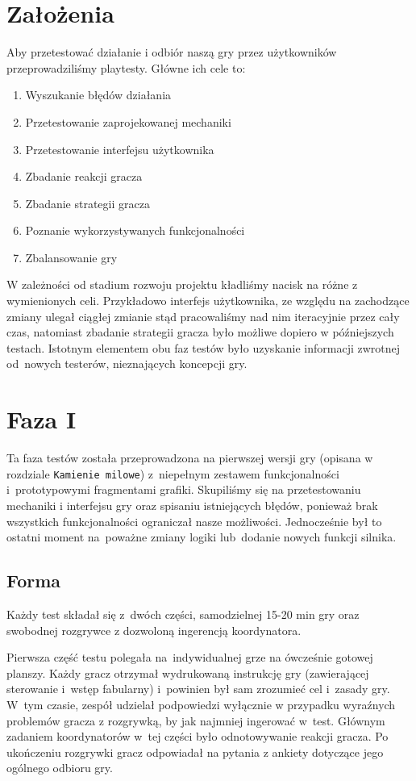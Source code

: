 \documentclass[licencjacka]{pracamgr}
\begin{document}
  \section{Założenia}
  Aby przetestować działanie i odbiór naszą gry przez użytkowników przeprowadziliśmy playtesty. Główne ich cele to:
  \begin{enumerate}
   \item Wyszukanie błędów działania
   \item Przetestowanie zaprojekowanej mechaniki
   \item Przetestowanie interfejsu użytkownika
   \item Zbadanie reakcji gracza
   \item Zbadanie strategii gracza
   \item Poznanie wykorzystywanych funkcjonalności
   \item Zbalansowanie gry
  \end{enumerate}
  W zależności od stadium rozwoju projektu kładliśmy nacisk na różne z wymienionych celi. Przykładowo interfejs użytkownika,
  ze względu na zachodzące zmiany ulegał ciągłej zmianie stąd pracowaliśmy nad nim iteracyjnie przez cały czas, natomiast
  zbadanie strategii gracza było możliwe dopiero w późniejszych testach. Istotnym elementem obu faz testów było uzyskanie 
  informacji zwrotnej od~nowych testerów, nieznających koncepcji gry.
    
    \section{Faza I}
      Ta faza testów została przeprowadzona na pierwszej wersji gry (opisana w rozdziale \texttt{Kamienie milowe})
      z~niepełnym zestawem funkcjonalności i~prototypowymi fragmentami grafiki. Skupiliśmy się na przetestowaniu mechaniki
      i interfejsu gry oraz spisaniu istniejących błędów, ponieważ brak wszystkich funkcjonalności ograniczał nasze możliwości.
      Jednocześnie był to ostatni moment na~poważne zmiany logiki lub~dodanie nowych funkcji silnika.

      \subsection{Forma}
      Każdy test składał  się z~dwóch części, samodzielnej 15-20 min gry
      oraz swobodnej rozgrywce z dozwoloną ingerencją koordynatora.
      
      Pierwsza część testu polegała na~indywidualnej grze na ówcześnie gotowej planszy.
      Każdy gracz otrzymał wydrukowaną instrukcję gry (zawierającej sterowanie i~wstęp fabularny)
      i~powinien był sam zrozumieć cel i~zasady gry. W~tym czasie, zespół udzielał podpowiedzi 
      wyłącznie w przypadku wyraźnych problemów gracza z rozgrywką, by jak najmniej ingerować w~test.
      Głównym zadaniem koordynatorów w~tej części było odnotowywanie reakcji gracza. 
      Po ukończeniu rozgrywki gracz odpowiadał na pytania z ankiety dotyczące jego ogólnego odbioru gry.
      
\end{document}
